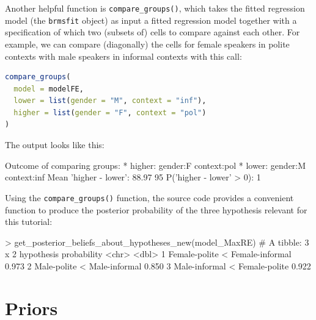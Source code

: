 \documentclass[nobib]{tufte-handout}
\begin{document}
Another helpful function is \texttt{compare\_groups()}, which takes the fitted regression model (the \texttt{brmsfit} object) as input a fitted
regression model together with a specification of which two (subsets of) cells to compare
against each other. For example, we can compare (diagonally) the cells for female speakers in
polite contexts with male speakers in informal contexts with this call:

\begin{minipage}[]{1.3\textwidth}
\begin{lstlisting}[language=R]
compare_groups(
  model = modelFE, 
  lower = list(gender = "M", context = "inf"),
  higher = list(gender = "F", context = "pol")
)
\end{lstlisting}
\end{minipage}

The output looks like this:

\medskip

\begin{minipage}[]{\textwidth}
\begin{rc}
Outcome of comparing groups:
 * higher:  gender:F context:pol 
 * lower:   gender:M context:inf 
Mean 'higher - lower':  88.97 
95%
P('higher - lower' > 0):  1 
\end{rc}
\end{minipage}

Using the \texttt{compare\_groups()} function, the source code provides a convenient function to
produce the posterior probability of the three hypothesis relevant for this tutorial:

\medskip

\begin{minipage}[]{\textwidth}
\begin{rc}
> get_posterior_beliefs_about_hypotheses_new(model_MaxRE)
# A tibble: 3 x 2
  hypothesis                      probability
  <chr>                                 <dbl>
1 Female-polite < Female-informal       0.973
2 Male-polite < Male-informal           0.850
3 Male-informal < Female-polite         0.922
\end{rc}
\end{minipage}

\section{Priors}
\end{document}
